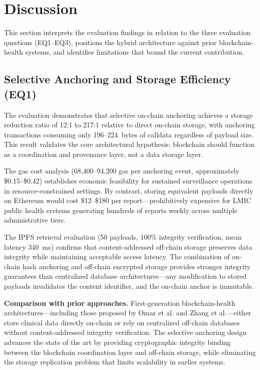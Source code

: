 \section{Discussion}\label{sec:discussion}

This section interprets the evaluation findings in relation to the three evaluation questions (EQ1--EQ3), positions the hybrid architecture against prior blockchain-health systems, and identifies limitations that bound the current contribution.

\subsection{Selective Anchoring and Storage Efficiency (EQ1)}\label{subsec:disc_anchoring}

The evaluation demonstrates that selective on-chain anchoring achieves a storage reduction ratio of 12:1 to 217:1 relative to direct on-chain storage, with anchoring transactions consuming only 196--224~bytes of calldata regardless of payload size. This result validates the core architectural hypothesis: blockchain should function as a coordination and provenance layer, not a data storage layer.

The gas cost analysis (68,400--94,200 gas per anchoring event, approximately \$0.15--\$0.42) establishes economic feasibility for sustained surveillance operations in resource-constrained settings. By contrast, storing equivalent payloads directly on Ethereum would cost \$12--\$180 per report---prohibitively expensive for LMIC public health systems generating hundreds of reports weekly across multiple administrative tiers.

The IPFS retrieval evaluation (50 payloads, 100\% integrity verification, mean latency 340~ms) confirms that content-addressed off-chain storage preserves data integrity while maintaining acceptable access latency. The combination of on-chain hash anchoring and off-chain encrypted storage provides stronger integrity guarantees than centralized database architectures---any modification to stored payloads invalidates the content identifier, and the on-chain anchor is immutable.

\textbf{Comparison with prior approaches.} First-generation blockchain-health architectures---including those proposed by Omar et al.\cite{omar2019privacy} and Zhang et al.\cite{zhang2018fhirchain}---either store clinical data directly on-chain or rely on centralized off-chain databases without content-addressed integrity verification. The selective anchoring design advances the state of the art by providing cryptographic integrity binding between the blockchain coordination layer and off-chain storage, while eliminating the storage replication problem that limits scalability in earlier systems.

